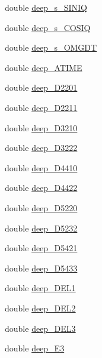 \begin{DoxyCompactItemize}
\begin{tabbing}
\end{tabbing}\item 
double \hyperlink{structdeep__data_a5479a146e76ceeeb6b39b8e2dc86423a}{deep\-\_\-s\-\_\-\-S\-I\-N\-I\-Q}
\item 
double \hyperlink{structdeep__data_aeb703feb0275a9df4c3f203f549cf68e}{deep\-\_\-s\-\_\-\-C\-O\-S\-I\-Q}
\item 
double \hyperlink{structdeep__data_a8f25fa88406d398af7e3dc77f5756492}{deep\-\_\-s\-\_\-\-O\-M\-G\-D\-T}
\item 
double \hyperlink{structdeep__data_a87e329466e9fc5dc95bca1bd0cbe036a}{deep\-\_\-\-A\-T\-I\-M\-E}
\item 
double \hyperlink{structdeep__data_ac16b78edb009129cc5ba63a684d7df06}{deep\-\_\-\-D2201}
\item 
double \hyperlink{structdeep__data_a0e6ac7d14886628f39b2dabbac5e9768}{deep\-\_\-\-D2211}
\item 
double \hyperlink{structdeep__data_a4d5d625f92b0af3ad25b4a12e4e13a7c}{deep\-\_\-\-D3210}
\item 
double \hyperlink{structdeep__data_ac121ab6ccd0b99df1566ff2348e75433}{deep\-\_\-\-D3222}
\item 
double \hyperlink{structdeep__data_a6777c25b08e398a519efa14ccc328b18}{deep\-\_\-\-D4410}
\item 
double \hyperlink{structdeep__data_a9ac99ac71a7e9d41e18e0b8d23881b27}{deep\-\_\-\-D4422}
\item 
double \hyperlink{structdeep__data_a070522e386b048a06c43a704492b63cd}{deep\-\_\-\-D5220}
\item 
double \hyperlink{structdeep__data_af6cb901bd696af94de75b2d78800db43}{deep\-\_\-\-D5232}
\item 
double \hyperlink{structdeep__data_a7f1d7113215d1faeeafcd818832f4da4}{deep\-\_\-\-D5421}
\item 
double \hyperlink{structdeep__data_ac7705b43b143e8a75b7a31f044000b19}{deep\-\_\-\-D5433}
\item 
double \hyperlink{structdeep__data_ae9e2a8ed7f2195320d1cd0fdb9b89dc4}{deep\-\_\-\-D\-E\-L1}
\item 
double \hyperlink{structdeep__data_aa6140563b789a280396850b260e6e33f}{deep\-\_\-\-D\-E\-L2}
\item 
double \hyperlink{structdeep__data_a1c596e0d8433da1dfb79124550ae55f3}{deep\-\_\-\-D\-E\-L3}
\item 
double \hyperlink{structdeep__data_a18bc60bed280f6304b0561e620a0fba1}{deep\-\_\-\-E3}
\item 

\end{DoxyCompactItemize}
